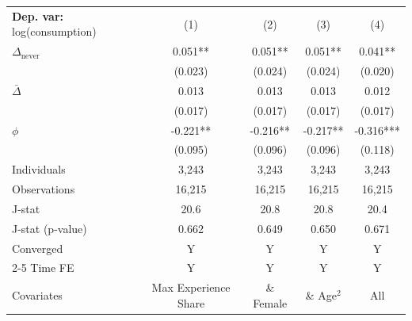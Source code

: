 \begin{tabular}{l cccc} \toprule  \textbf{Dep. var:}  log(consumption) 
                    &\multicolumn{1}{c}{(1)}   &\multicolumn{1}{c}{(2)}   &\multicolumn{1}{c}{(3)}   &\multicolumn{1}{c}{(4)}   \\

\addlinespace
$\Delta_{\text{never}}$&       0.051** &       0.051** &       0.051** &       0.041** \\
                    &     (0.023)   &     (0.024)   &     (0.024)   &     (0.020)   \\

\addlinespace
$\bar{\Delta}$      &       0.013   &       0.013   &       0.013   &       0.012   \\
                    &     (0.017)   &     (0.017)   &     (0.017)   &     (0.017)   \\

\addlinespace
$\phi$              &      -0.221** &      -0.216** &      -0.217** &      -0.316***\\
                    &     (0.095)   &     (0.096)   &     (0.096)   &     (0.118)   \\
\addlinespace
Individuals         &       3,243   &       3,243   &       3,243   &       3,243   \\
Observations        &      16,215   &      16,215   &      16,215   &      16,215   \\
J-stat              &        20.6   &        20.8   &        20.8   &        20.4   \\
J-stat (p-value)    &       0.662   &       0.649   &       0.650   &       0.671   \\
Converged           &           Y   &           Y   &           Y   &           Y   \\
\cmidrule{2-5} Time FE & Y & Y & Y & Y \\ Covariates & Max Experience Share & \& Female & \& Age$^2$ & All \\ \bottomrule \end{tabular}
